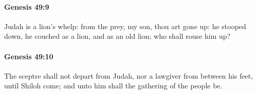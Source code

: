 		\paragraph{Genesis 49:9} %
			\label{GENESIS-49-9}

			Judah is a lion's whelp: from the prey, my son, thou art gone up: he stooped down, he couched as a lion, and as an old lion; who shall rouse him up?


		\paragraph{Genesis 49:10} %
			\label{GENESIS-49-10}

			The sceptre shall not depart from Judah, nor a lawgiver from between his feet, until Shiloh come; and unto him shall the gathering of the people be.


